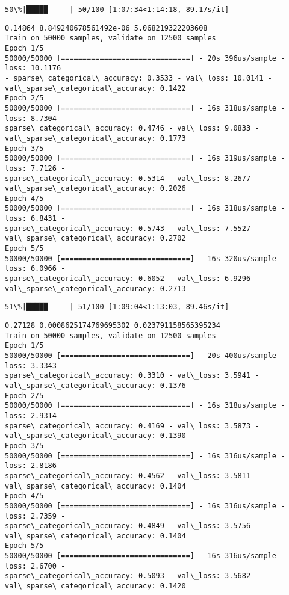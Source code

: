 \documentclass[11pt]{article}
\begin{document}
    \begin{Verbatim}[commandchars=\\\{\}]
 50\%|█████     | 50/100 [1:07:34<1:14:18, 89.17s/it]
    \end{Verbatim}

    \begin{Verbatim}[commandchars=\\\{\}]
0.14864 8.849240678561492e-06 5.068219322203608
Train on 50000 samples, validate on 12500 samples
Epoch 1/5
50000/50000 [==============================] - 20s 396us/sample - loss: 10.1176
- sparse\_categorical\_accuracy: 0.3533 - val\_loss: 10.0141 -
val\_sparse\_categorical\_accuracy: 0.1422
Epoch 2/5
50000/50000 [==============================] - 16s 318us/sample - loss: 8.7304 -
sparse\_categorical\_accuracy: 0.4746 - val\_loss: 9.0833 -
val\_sparse\_categorical\_accuracy: 0.1773
Epoch 3/5
50000/50000 [==============================] - 16s 319us/sample - loss: 7.7126 -
sparse\_categorical\_accuracy: 0.5314 - val\_loss: 8.2677 -
val\_sparse\_categorical\_accuracy: 0.2026
Epoch 4/5
50000/50000 [==============================] - 16s 318us/sample - loss: 6.8431 -
sparse\_categorical\_accuracy: 0.5743 - val\_loss: 7.5527 -
val\_sparse\_categorical\_accuracy: 0.2702
Epoch 5/5
50000/50000 [==============================] - 16s 320us/sample - loss: 6.0966 -
sparse\_categorical\_accuracy: 0.6052 - val\_loss: 6.9296 -
val\_sparse\_categorical\_accuracy: 0.2713
    \end{Verbatim}

    \begin{Verbatim}[commandchars=\\\{\}]
 51\%|█████     | 51/100 [1:09:04<1:13:03, 89.46s/it]
    \end{Verbatim}

    \begin{Verbatim}[commandchars=\\\{\}]
0.27128 0.0008625174769695302 0.023791158565395234
Train on 50000 samples, validate on 12500 samples
Epoch 1/5
50000/50000 [==============================] - 20s 400us/sample - loss: 3.3343 -
sparse\_categorical\_accuracy: 0.3310 - val\_loss: 3.5941 -
val\_sparse\_categorical\_accuracy: 0.1376
Epoch 2/5
50000/50000 [==============================] - 16s 318us/sample - loss: 2.9314 -
sparse\_categorical\_accuracy: 0.4169 - val\_loss: 3.5873 -
val\_sparse\_categorical\_accuracy: 0.1390
Epoch 3/5
50000/50000 [==============================] - 16s 316us/sample - loss: 2.8186 -
sparse\_categorical\_accuracy: 0.4562 - val\_loss: 3.5811 -
val\_sparse\_categorical\_accuracy: 0.1404
Epoch 4/5
50000/50000 [==============================] - 16s 316us/sample - loss: 2.7359 -
sparse\_categorical\_accuracy: 0.4849 - val\_loss: 3.5756 -
val\_sparse\_categorical\_accuracy: 0.1404
Epoch 5/5
50000/50000 [==============================] - 16s 316us/sample - loss: 2.6700 -
sparse\_categorical\_accuracy: 0.5093 - val\_loss: 3.5682 -
val\_sparse\_categorical\_accuracy: 0.1420
    \end{Verbatim}
\end{document}
